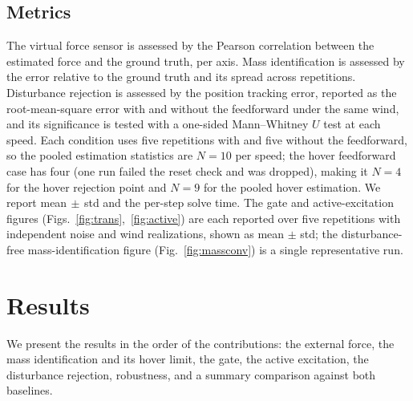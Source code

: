 \documentclass[lettersize,journal]{IEEEtran}
\begin{document}
\subsection{Metrics}
The virtual force sensor is assessed by the Pearson correlation between the
estimated force and the ground truth, per axis. Mass identification is assessed
by the error relative to the ground truth and its spread across repetitions.
Disturbance rejection is assessed by the position tracking error, reported as the
root-mean-square error with and without the feedforward under the same wind, and
its significance is tested with a one-sided Mann--Whitney $U$ test at each speed.
Each condition uses five repetitions with and five without the feedforward, so the
pooled estimation statistics are $N=10$ per speed; the hover feedforward case has
four (one run failed the reset check and was dropped), making it $N=4$ for the
hover rejection point and $N=9$ for the pooled hover estimation. We report
mean$\,\pm\,$std and the per-step solve time. The gate and active-excitation
figures (Figs.~\ref{fig:trans},~\ref{fig:active}) are each reported over five
repetitions with independent noise and wind realizations, shown as mean $\pm$ std;
the disturbance-free mass-identification figure (Fig.~\ref{fig:massconv}) is a
single representative run.

\section{Results}\label{sec:results}

We present the results in the order of the contributions: the external force, the
mass identification and its hover limit, the gate, the active excitation, the
disturbance rejection, robustness, and a summary comparison against both
baselines.
\end{document}
